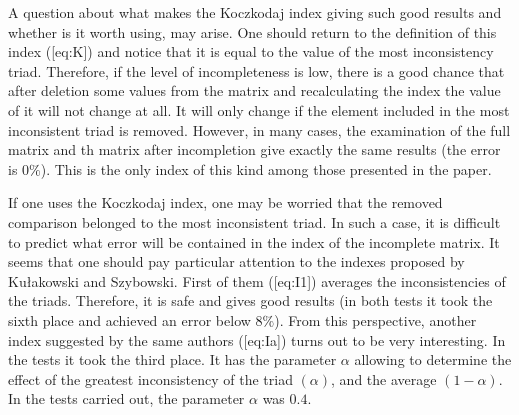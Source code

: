 A question about what makes the Koczkodaj index giving such good results and whether is it worth using, may arise. One should return to the definition of this index ([eq:K]) and notice that it is equal to the value of the most inconsistency triad. Therefore, if the level of incompleteness is low, there is a good chance that after deletion some values from the matrix and recalculating the index the value of it will not change at all. It will only change if the element included in the most inconsistent triad is removed. However, in many cases, the examination of the full matrix and th matrix after incompletion give exactly the same results (the error is $0\%$). This is the only index of this kind among those presented in the paper.

If one uses the Koczkodaj index, one may be worried that the removed comparison belonged to the most inconsistent triad. In such a case, it is difficult to predict what error will be contained in the index of the incomplete matrix. It seems that one should pay particular attention to the indexes proposed by Kułakowski and Szybowski. First of them ([eq:I1]) averages the inconsistencies of the triads. Therefore, it is safe and gives good results (in both tests it took the sixth place and achieved an error below $8\%$). From this perspective, another index suggested by the same authors ([eq:Ia]) turns out to be very interesting. In the tests it took the third place. It has the parameter $\alpha$ allowing to determine the effect of the greatest inconsistency of the triad $\left(\alpha\right)$, and the average $\left(1-\alpha\right)$. In the tests carried out, the parameter $\alpha$ was $0.4$.